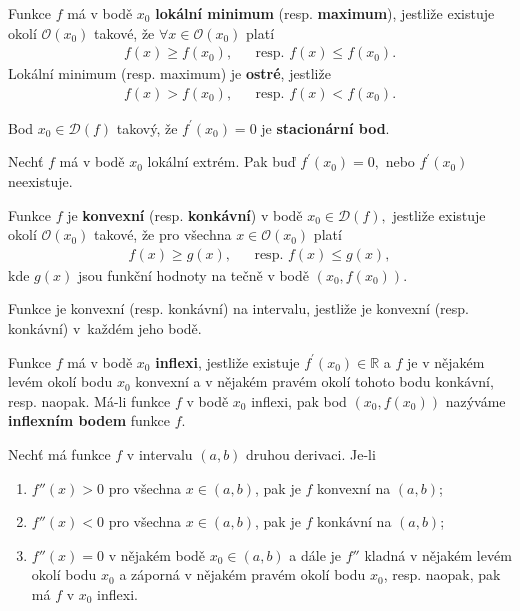 \begin{definition}
Funkce $f$ má v bodě $x_0$ \textbf{lokální minimum} (resp. \textbf{maximum}),
jestliže existuje okolí $\mathscr O(x_0)$ takové, že $\forall x \in \mathscr O(x_0)$ platí
\begin{align*}
    f(x)\geq f(x_0), & & \textrm{resp. } f(x)\leq f(x_0).
\end{align*}
Lokální minimum (resp. maximum) je \textbf{ostré}, jestliže
\begin{align*}
    f(x)> f(x_0), & & \textrm{resp. } f(x)<f(x_0).
\end{align*}
\end{definition}

\begin{definition}
Bod $x_0\in \mathcal D(f)$ takový, že $f^\prime(x_0)=0$ je \textbf{stacionární bod}.
\end{definition}

\begin{veta}
Nechť $f$ má v bodě $x_0$ lokální extrém. Pak buď $f^\prime(x_0)=0,$ nebo
$f^\prime(x_0)$ neexistuje.
\end{veta}

\begin{definition}\label{konvkonk}
Funkce $f$ je \textbf{konvexní} (resp. \textbf{konkávní}) v bodě $x_0\in \mathcal D(f),$
jestliže existuje okolí $\mathscr O(x_0)$ takové, že pro všechna $x\in\mathscr O(x_0)$
platí
\begin{align*}
    f(x)\geq g(x), & & \textrm{resp. } f(x)\leq g(x),
\end{align*}
kde $g(x)$ jsou funkční hodnoty na tečně v bodě $(x_0,f(x_0)).$

Funkce je konvexní (resp. konkávní) na intervalu, jestliže je konvexní (resp.
konkávní) v~každém jeho bodě.
\end{definition}

\begin{definition}
Funkce $f$ má v bodě $x_0$ \textbf{inflexi}, jestliže existuje $f^\prime(x_0) \in
\mathbb R$ a $f$ je v nějakém levém okolí bodu $x_0$ konvexní a v nějakém pravém okolí
tohoto bodu konkávní, resp. naopak. Má-li funkce $f$ v bodě $x_0$ inflexi, pak bod
$(x_0, f(x_0))$ nazýváme \textbf{inflexním bodem} funkce $f$.
\end{definition}

\begin{veta}
Nechť má funkce $f$ v intervalu $(a,b)$ druhou derivaci. Je-li
\begin{enumerate}[$i.$]
\item $f'' (x)>0$ pro všechna $x \in (a,b)$, pak je $f$
konvexní na $(a,b)$;
\item $f''(x)<0$ pro všechna $x \in (a,b)$, pak je $f$
konkávní na $(a,b)$;
\item $f''(x)=0$ v nějakém bodě $x_0\in(a,b)$ a dále je $f''$
kladná v nějakém levém okolí bodu $x_0$ a záporná v nějakém pravém okolí bodu $x_0$,
resp. naopak, pak má $f$ v $x_0$ inflexi.
\end{enumerate}
\end{veta}

